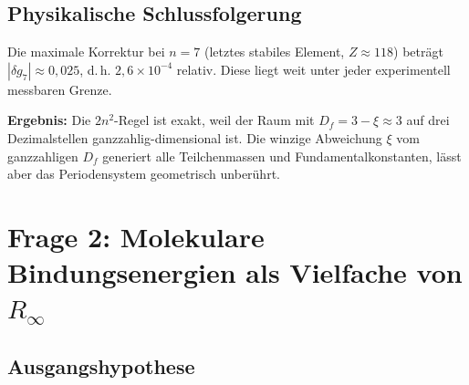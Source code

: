 \begin{table}[htbp]
\centering
\caption{T0-Korrektur der Schalenentartung $g_n^{(\mathrm{T0})} = 2n^{2-\xi}$}
\label{tab:gn-korrektur}
\end{table}

\subsection{Physikalische Schlussfolgerung}
\label{subsec:schluss-gn}

Die maximale Korrektur bei $n=7$ (letztes stabiles Element, $Z \approx 118$)
beträgt $|\delta g_7| \approx 0{,}025$, d.\,h. $2{,}6 \times 10^{-4}$ relativ.
Diese liegt weit unter jeder experimentell messbaren Grenze.

\textbf{Ergebnis:} Die $2n^2$-Regel ist exakt, weil der Raum mit
$D_f = 3 - \xi \approx 3$ auf drei Dezimalstellen ganzzahlig-dimensional ist.
Die winzige Abweichung $\xi$ vom ganzzahligen $D_f$ generiert alle
Teilchenmassen und Fundamentalkonstanten, lässt aber das Periodensystem
geometrisch unberührt.

\section{Frage 2: Molekulare Bindungsenergien als Vielfache von \texorpdfstring{$R_\infty$}{R\_inf}}
\label{sec:bindungsenergien}

\subsection{Ausgangshypothese}
\label{subsec:hypothese-be}

